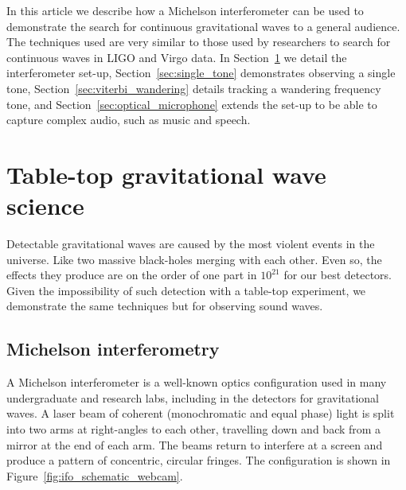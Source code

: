 \documentclass[prb,preprint]{revtex4-1}
\begin{document}
In this article we describe how a Michelson interferometer can be used to demonstrate the search for continuous gravitational waves to a general audience. 
The techniques used are very similar to those used by researchers to search for continuous waves in LIGO and Virgo data.
In Section~\ref{sec:ifo} we detail the interferometer set-up, Section~\ref{sec:single_tone} demonstrates observing a single tone, Section~\ref{sec:viterbi_wandering} details tracking a wandering frequency tone, and Section~\ref{sec:optical_microphone} extends the set-up to be able to capture complex audio, such as music and speech.


\section{Table-top gravitational wave science}
\label{sec:ifo}

Detectable gravitational waves are caused by the most violent events in the universe. Like two massive black-holes merging with each other. Even so, the effects they produce are on the order of one part in $10^{21}$ for our best detectors\cite{GW150914}. Given the impossibility of such detection with a table-top experiment, we demonstrate the same techniques but for observing sound waves.

\subsection{Michelson interferometry}

A Michelson interferometer is a well-known optics configuration used in many undergraduate and research labs, including in the detectors for gravitational waves. A laser beam of coherent (monochromatic and equal phase) light is split into two arms at right-angles to each other, travelling down and back from a mirror at the end of each arm. The beams return to interfere at a screen and produce a pattern of concentric, circular fringes. The configuration is shown in Figure~\ref{fig:ifo_schematic_webcam}.
\end{document}
